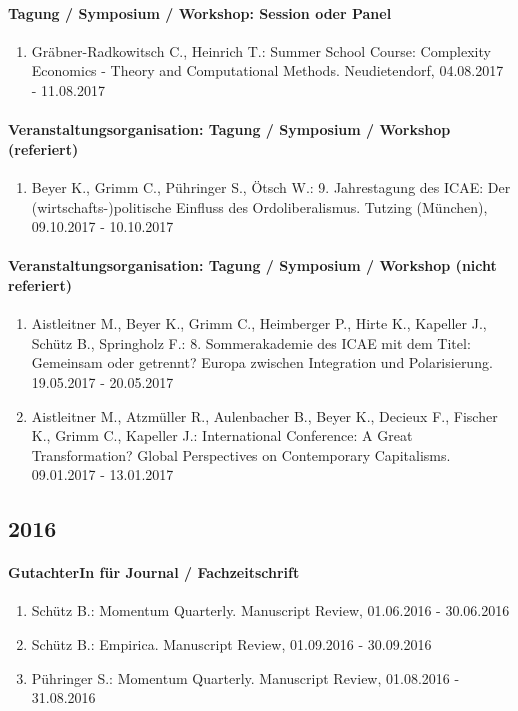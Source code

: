 \paragraph{Tagung / Symposium / Workshop: Session oder Panel} 
\begin{enumerate}[leftmargin=*, labelsep=0.5cm] 
 	 \item Gräbner-Radkowitsch C., Heinrich T.: Summer School Course: Complexity Economics - Theory and Computational Methods. Neudietendorf, 04.08.2017 - 11.08.2017 
\end{enumerate} 
\paragraph{Veranstaltungsorganisation: Tagung / Symposium / Workshop (referiert)} 
\begin{enumerate}[leftmargin=*, labelsep=0.5cm] 
 	 \item Beyer K., Grimm C., Pühringer S., Ötsch W.: 9. Jahrestagung des ICAE: Der (wirtschafts-)politische Einfluss des Ordoliberalismus. Tutzing (München), 09.10.2017 - 10.10.2017 
\end{enumerate} 
\paragraph{Veranstaltungsorganisation: Tagung / Symposium / Workshop (nicht referiert)} 
\begin{enumerate}[leftmargin=*, labelsep=0.5cm] 
 	 \item Aistleitner M., Beyer K., Grimm C., Heimberger P., Hirte K., Kapeller J., Schütz B., Springholz F.: 8. Sommerakademie des ICAE mit dem Titel: Gemeinsam oder getrennt? Europa zwischen Integration und Polarisierung. 19.05.2017 - 20.05.2017 
	 \item Aistleitner M., Atzmüller R., Aulenbacher B., Beyer K., Decieux F., Fischer K., Grimm C., Kapeller J.: International Conference: A Great Transformation? Global Perspectives on Contemporary Capitalisms. 09.01.2017 - 13.01.2017 
\end{enumerate} 
\subsection*{2016} 
\paragraph{GutachterIn für Journal / Fachzeitschrift} 
\begin{enumerate}[leftmargin=*, labelsep=0.5cm] 
 	 \item Schütz B.: Momentum Quarterly. Manuscript Review, 01.06.2016 - 30.06.2016 
	 \item Schütz B.: Empirica. Manuscript Review, 01.09.2016 - 30.09.2016 
	 \item Pühringer S.: Momentum Quarterly. Manuscript Review, 01.08.2016 - 31.08.2016 
\end{enumerate} 
